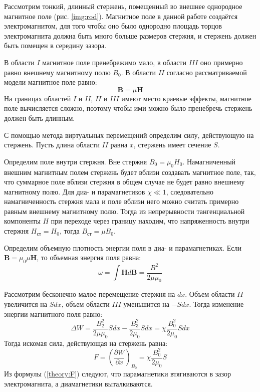 \documentclass[12pt,a4paper]{article}
\begin{document}
	Рассмотрим тонкий, длинный стержень, помещенный во внешнее однородное магнитное поле (рис. \ref{img:rod}). Магнитное поле в данной работе создаётся электромагнитом, для того чтобы оно было однородно площадь торцов электромагнита должна быть много больше размеров стержня, и стержень должен быть помещен в середину зазора.
	
	В области $I$ магнитное поле пренебрежимо мало, в области $III$ оно примерно равно внешнему магнитному полю $B_0$. В области $II$ согласно рассматриваемой модели магнитное поле равно:
	$$
	\boldsymbol{B} = \mu \boldsymbol{H}
	$$
	На границах областей $I$ и $II$, $II$ и $III$ имеют место краевые эффекты, магнитное поле вычисляется сложно, поэтому чтобы ими можно было пренебречь стержень должен быть длинным.
	
	С помощью метода виртуальных перемещений определим силу, действующую на стержень. Пусть длина области $II$ равна $x$, стержень имеет сечение $S$.
	
	Определим поле внутри стержня. Вне стержня $B_0 = \mu_0 H_0$. Намагниченный внешним магнитным полем стержень будет вблизи создавать магнитное поле, так, что суммарное поле вблизи стержня в общем случае не будет равно внешнему магнитному полю. Для диа- и парамагнетиков $\chi \ll 1$, следовательно намагниченность стержня мала и поле вблизи него можно считать примерно равным внешнему магнитному полю. Тогда из непрерывности тангенциальной компоненты $H$ при переходе через границу находим, что напряженность внутри стержня $H_{ст} = H_0$, тогда $B_{ст} = \mu B_0$.
	
	Определим объемную плотность энергии поля в диа- и парамагнетиках. Если $\boldsymbol{B} = \mu_0 \mu \boldsymbol{H}$, то объемная энергия поля равна:
	$$
	\omega = \int{\boldsymbol{H} d\boldsymbol{B}} = \frac{B^2}{2 \mu \mu_0}
	$$
	
	Рассмотрим бесконечно малое перемещение стержня на $dx$. Объем области $II$ увеличится на $S dx$, объем области $III$ уменьшится на $- S dx$. Тогда изменение энергии магнитного поля равно:
	$$
	\Delta W = \frac{B_2^2}{2 \mu \mu_0} S dx - \frac{B_3^2}{2 \mu_0} S dx = \chi \frac{B_0^2}{2 \mu_0} S dx
	$$
	Тогда искомая сила, действующая на стержень равна:
	\begin{equation}
		F = \left( \frac{\partial W}{\partial x} \right)_{B_0} = \chi \frac{B_0^2}{2 \mu_0} S
		\label{theory:F}
	\end{equation}
	Из формулы (\ref{theory:F}) следуют, что парамагнетики втягиваются в зазор электромагнита, а диамагнетики выталкиваются.
	
\end{document}
